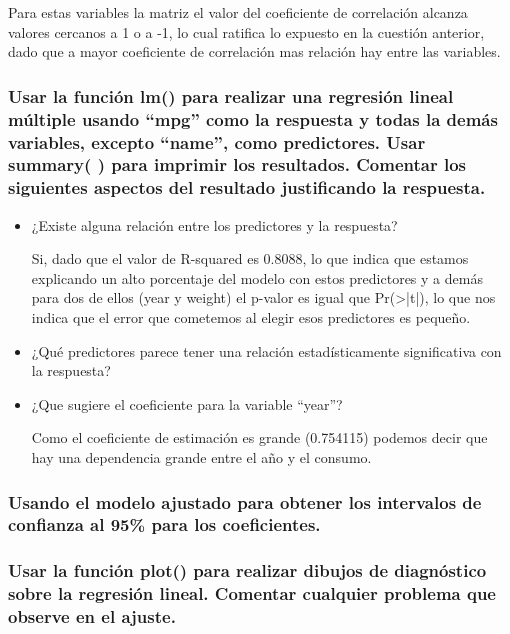 Para estas variables la matriz el valor del coeficiente de correlación alcanza valores cercanos a 1 o a -1, lo cual ratifica lo expuesto en la cuestión anterior, dado que a mayor coeficiente de correlación mas relación hay entre las variables.

\subsubsection{Usar la función lm() para realizar una regresión lineal múltiple usando “mpg” como la respuesta y todas la demás variables, excepto “name”, como predictores. Usar summary( ) para imprimir los resultados. Comentar los siguientes aspectos del resultado justificando la respuesta.}

\begin{itemize}

\item ¿Existe alguna relación entre los predictores y la respuesta?

Si, dado que el valor de R-squared es 0.8088, lo que indica que estamos explicando un alto porcentaje del modelo con estos predictores y a demás para dos de ellos (year y weight) el p-valor es igual que Pr(>|t|), lo que nos indica que el error que cometemos al elegir esos predictores es pequeño.

\item ¿Qué predictores parece tener una relación estadísticamente significativa con la respuesta?



\item ¿Que sugiere el coeficiente para la variable “year”?

Como el coeficiente de estimación es grande (0.754115) podemos decir que hay una dependencia grande entre el año y el consumo.

\end{itemize}

\subsubsection{Usando el modelo ajustado para obtener los intervalos de confianza al 95\% para los coeficientes.}

\subsubsection{Usar la función plot() para realizar dibujos de diagnóstico sobre la regresión lineal. Comentar cualquier problema que observe en el ajuste.}

